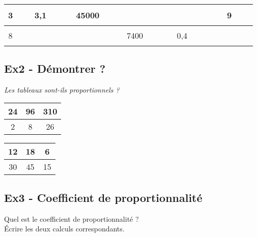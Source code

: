 \begin{center} \begin{tabular}{|c|c|c|c|c|c|} \hline
   3 &  3,1                   &                  45000 &  $\phantom{\dfrac{azertyuiop}{O}}$ & $\phantom{\dfrac{azertyuiop}{O}}$&                     9\\ \hline
   8 &  $\phantom{\dfrac{azertyuiop}{O}}$ & $\phantom{\dfrac{azertyuiop}{O}}$ &                   7400 &                    0,4 &  $\phantom{\dfrac{azertyuiop}{O}}$\\ \hline     
  \end{tabular}\end{center}

\Pointilles[5]

\subsection*{Ex2 - Démontrer ?}

\textit{Les tableaux sont-ils proportionnels ? } 

\begin{multicols}{2}\noindent
  \begin{center}\begin{tabular}{|c|c|c|} \hline
    24 & 96 & 310 \\  \hline
    2 & 8 & 26\\  \hline
  \end{tabular}\end{center}

  \Pointilles[5]  \columnbreak 

  \begin{center}\begin{tabular}{|c|c|c|} \hline
    12 & 18 & 6 \\  \hline
    30 & 45 & 15\\  \hline
  \end{tabular}\end{center}

  \Pointilles[5] 

\end{multicols}

\subsection*{Ex3 - Coefficient de proportionnalité}

Quel est le coefficient de proportionnalité ?\\
Écrire les deux calculs correspondants.


